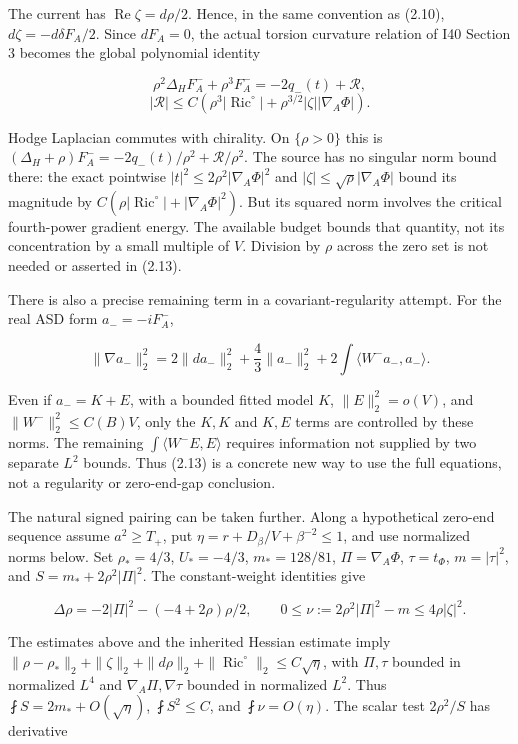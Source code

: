 \documentclass[
  11pt,
]{article}
\begin{document}
The current has \(\operatorname{Re}\zeta=d\rho/2\). Hence, in the same
convention as (2.10), \(d\zeta=-d\delta F_A/2\). Since \(dF_A=0\), the
actual torsion curvature relation of I40 Section 3 becomes the global
polynomial identity

\[
 \boxed{\rho^2\Delta_H F_A^-+\rho^3F_A^-
                  =-2q_-(t)+\mathcal R,}
 \tag{2.13}
\] \[
 |\mathcal R|\le C\left(\rho^3|\operatorname{Ric}^{\circ}|
                 +\rho^{3/2}|\zeta||\nabla_A\Phi|\right).
\]

Hodge Laplacian commutes with chirality. On \(\{\rho>0\}\) this is
\((\Delta_H+\rho)F_A^-=-2q_-(t)/\rho^2+\mathcal R/\rho^2\). The source
has no singular norm bound there: the exact pointwise
\(|t|^2\le2\rho^2|\nabla_A\Phi|^2\) and
\(|\zeta|\le\sqrt\rho|\nabla_A\Phi|\) bound its magnitude by
\(C(\rho|\operatorname{Ric}^{\circ}|+|\nabla_A\Phi|^2)\). But its
squared norm involves the critical fourth-power gradient energy. The
available budget bounds that quantity, not its concentration by a small
multiple of \(V\). Division by \(\rho\) across the zero set is not
needed or asserted in (2.13).

There is also a precise remaining term in a covariant-regularity
attempt. For the real ASD form \(a_-=-iF_A^-\),

\[
 \|\nabla a_-\|_2^2=2\|da_-\|_2^2+
       \frac43\|a_-\|_2^2+2\int\langle W^-a_-,a_-\rangle.
 \tag{2.14}
\]

Even if \(a_-=K+E\), with a bounded fitted model \(K\),
\(\|E\|_2^2=o(V)\), and \(\|W^-\|_2^2\le C(B)V\), only the \(K,K\) and
\(K,E\) terms are controlled by these norms. The remaining
\(\int\langle W^-E,E\rangle\) requires information not supplied by two
separate \(L^2\) bounds. Thus (2.13) is a concrete new way to use the
full equations, not a regularity or zero-end-gap conclusion.

The natural signed pairing can be taken further. Along a hypothetical
zero-end sequence assume \(a^2\ge T_+\), put
\(\eta=r+D_\beta/V+\beta^{-2}\le1\), and use normalized norms below. Set
\(\rho_*=4/3\), \(U_*=-4/3\), \(m_*=128/81\), \(\Pi=\nabla_A\Phi\),
\(\tau=t_\Phi\), \(m=|\tau|^2\), and \(S=m_*+2\rho^2|\Pi|^2\). The
constant-weight identities give

\[
\Delta\rho=-2|\Pi|^2-(-4+2\rho)\rho/2,\qquad
0\le\nu:=2\rho^2|\Pi|^2-m\le4\rho|\zeta|^2.
\]

The estimates above and the inherited Hessian estimate imply
\(\|\rho-\rho_*\|_2+\|\zeta\|_2+\|d\rho\|_2 +\|\operatorname{Ric}^{\circ}\|_2\le C\sqrt\eta\),
with \(\Pi,\tau\) bounded in normalized \(L^4\) and
\(\nabla_A\Pi,\nabla\tau\) bounded in normalized \(L^2\). Thus
\(\fint S=2m_*+O(\sqrt\eta)\), \(\fint S^2\le C\), and
\(\fint\nu=O(\eta)\). The scalar test \(2\rho^2/S\) has derivative
\end{document}

